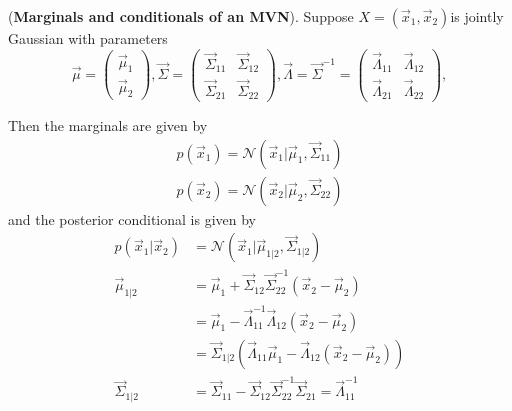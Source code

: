 \begin{theorem}(\textbf{Marginals and conditionals of an MVN}). Suppose $X=(\vec{x}_1,\vec{x}_2)$is jointly Gaussian with parameters
\begin{equation}
\vec{\mu}=\left(\begin{array}{c}\vec{\mu}_1 \\
                                \vec{\mu}_2\end{array}\right),
\vec{\Sigma}=\left(\begin{array}{cc}
                   \vec{\Sigma}_{11} & \vec{\Sigma}_{12} \\
 				   \vec{\Sigma}_{21} & \vec{\Sigma}_{22} \end{array}\right),
\vec{\Lambda}=\vec{\Sigma}^{-1}=\left(\begin{array}{cc}
                   \vec{\Lambda}_{11} & \vec{\Lambda}_{12} \\
 				   \vec{\Lambda}_{21} & \vec{\Lambda}_{22} \end{array}\right),
\end{equation}

Then the marginals are given by
\begin{equation}
\begin{split}
p(\vec{x}_1)= \mathcal{N}(\vec{x}_1|\vec{\mu}_1,\vec{\Sigma}_{11})\\
p(\vec{x}_2)= \mathcal{N}(\vec{x}_2|\vec{\mu}_2,\vec{\Sigma}_{22})
\end{split}
\end{equation}
and the posterior conditional is given by
\begin{equation}\label{eqn:Marginals-and-conditionals-of-an-MVN}
  \boxed{\begin{split}
    p(\vec{x}_1|\vec{x}_2)& =\mathcal{N}(\vec{x}_1|\vec{\mu}_{1|2},\vec{\Sigma}_{1|2}) \\
    \vec{\mu}_{1|2}& = \vec{\mu}_1+\vec{\Sigma}_{12}\vec{\Sigma}_{22}^{-1}(\vec{x}_2-\vec{\mu}_2) \\
	               & = \vec{\mu}_1-\vec{\Lambda}_{11}^{-1}\vec{\Lambda}_{12}(\vec{x}_2-\vec{\mu}_2) \\
				   & = \vec{\Sigma}_{1|2}(\vec{\Lambda}_{11}\vec{\mu}_1-\vec{\Lambda}_{12}(\vec{x}_2-\vec{\mu}_2)) \\
	\vec{\Sigma}_{1|2}& = \vec{\Sigma}_{11}-\vec{\Sigma}_{12}\vec{\Sigma}_{22}^{-1}\vec{\Sigma}_{21}=\vec{\Lambda}_{11}^{-1}
  \end{split}}
\end{equation}
\end{theorem}

